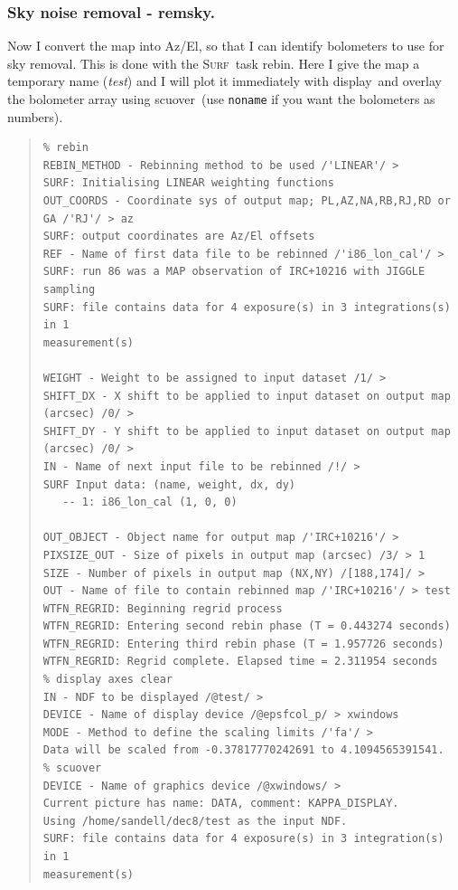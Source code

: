\documentclass[twoside,11pt]{article}
\newenvironment{myquote}{\begin{quote}\begin{small}}{\end{small}\end{quote}}
\newcommand{\surf}{\xref{\textsc{Surf}}{sun216}{}}
\newcommand{\task}[1]{\textsf{#1}}
\newcommand{\rebin}{\xref{\task{rebin}}{sun216}{REBIN}}
\newcommand{\remsky}{\xref{\task{remsky}}{sun216}{REMSKY}}
\newcommand{\scuover}{\xref{\task{scuover}}{sun216}{SCUOVER}}
\newcommand{\display}{\xref{\task{display}}{sun95}{DISPLAY}}
\newcommand{\xref}[3]{#1}
\newcommand{\xlabel}[1]{}
\renewcommand{\_}{\texttt{\symbol{95}}}
\begin{document}
\subsubsection{\xlabel{Sky_Noise_Removal_remsky}Sky noise removal - \remsky.}


Now I convert the map into Az/El, so that I can identify bolometers to
use for sky removal. This is done with the \surf\ task \rebin. Here I
give the map a temporary name ({\it test}) and I will plot it
immediately with \display\ and overlay the bolometer array using
\scuover\ (use \texttt{noname} if you want the bolometers as numbers).

\begin{myquote}
\begin{verbatim}
% rebin
REBIN_METHOD - Rebinning method to be used /'LINEAR'/ > 
SURF: Initialising LINEAR weighting functions
OUT_COORDS - Coordinate sys of output map; PL,AZ,NA,RB,RJ,RD or GA /'RJ'/ > az
SURF: output coordinates are Az/El offsets
REF - Name of first data file to be rebinned /'i86_lon_cal'/ > 
SURF: run 86 was a MAP observation of IRC+10216 with JIGGLE sampling
SURF: file contains data for 4 exposure(s) in 3 integrations(s) in 1
measurement(s)
 
WEIGHT - Weight to be assigned to input dataset /1/ > 
SHIFT_DX - X shift to be applied to input dataset on output map (arcsec) /0/ > 
SHIFT_DY - Y shift to be applied to input dataset on output map (arcsec) /0/ > 
IN - Name of next input file to be rebinned /!/ > 
SURF Input data: (name, weight, dx, dy)
   -- 1: i86_lon_cal (1, 0, 0)
 
OUT_OBJECT - Object name for output map /'IRC+10216'/ > 
PIXSIZE_OUT - Size of pixels in output map (arcsec) /3/ > 1
SIZE - Number of pixels in output map (NX,NY) /[188,174]/ > 
OUT - Name of file to contain rebinned map /'IRC+10216'/ > test
WTFN_REGRID: Beginning regrid process
WTFN_REGRID: Entering second rebin phase (T = 0.443274 seconds)
WTFN_REGRID: Entering third rebin phase (T = 1.957726 seconds)
WTFN_REGRID: Regrid complete. Elapsed time = 2.311954 seconds
% display axes clear
IN - NDF to be displayed /@test/ > 
DEVICE - Name of display device /@epsfcol_p/ > xwindows
MODE - Method to define the scaling limits /'fa'/ > 
Data will be scaled from -0.37817770242691 to 4.1094565391541.
% scuover
DEVICE - Name of graphics device /@xwindows/ > 
Current picture has name: DATA, comment: KAPPA_DISPLAY.
Using /home/sandell/dec8/test as the input NDF.
SURF: file contains data for 4 exposure(s) in 3 integration(s) in 1
measurement(s)
\end{verbatim}
\end{myquote}
\end{document}
